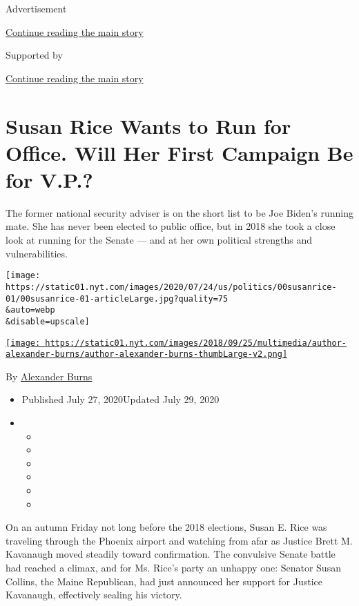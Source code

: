 Advertisement

\protect\hyperlink{after-top}{Continue reading the main story}

Supported by

\protect\hyperlink{after-sponsor}{Continue reading the main story}

\hypertarget{susan-rice-wants-to-run-for-office-will-her-first-campaign-be-for-vp}{%
\section{Susan Rice Wants to Run for Office. Will Her First Campaign Be
for
V.P.?}\label{susan-rice-wants-to-run-for-office-will-her-first-campaign-be-for-vp}}

The former national security adviser is on the short list to be Joe
Biden's running mate. She has never been elected to public office, but
in 2018 she took a close look at running for the Senate --- and at her
own political strengths and vulnerabilities.

\texttt{[image: https://static01.nyt.com/images/2020/07/24/us/politics/00susanrice-01/00susanrice-01-articleLarge.jpg?quality=75\\\&auto=webp\\\&disable=upscale]}

\href{https://www.nytimes.com/by/alexander-burns}{\texttt{[image: https://static01.nyt.com/images/2018/09/25/multimedia/author-alexander-burns/author-alexander-burns-thumbLarge-v2.png]}}

By \href{https://www.nytimes.com/by/alexander-burns}{Alexander Burns}

\begin{itemize}
\item
  Published July 27, 2020Updated July 29, 2020
\item
  \begin{itemize}
  \item
  \item
  \item
  \item
  \item
  \item
  \end{itemize}
\end{itemize}

On an autumn Friday not long before the 2018 elections, Susan E. Rice
was traveling through the Phoenix airport and watching from afar as
Justice Brett M. Kavanaugh moved steadily toward confirmation. The
convulsive Senate battle had reached a climax, and for Ms. Rice's party
an unhappy one: Senator Susan Collins, the Maine Republican, had just
announced her support for Justice Kavanaugh, effectively sealing his
victory.

